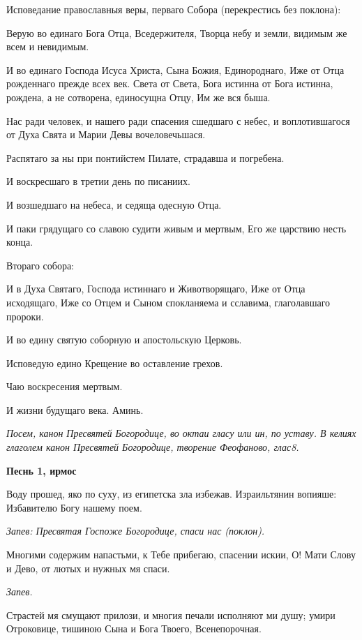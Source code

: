 Исповедание православныя веры, перваго Собора (перекрестись без поклона):


Верую во единаго Бога Отца, Вседержителя, Творца небу и земли, видимым же всем и невидимым.


И во единаго Господа Исуса Христа, Сына Божия, Единороднаго, Иже от Отца рожденнаго прежде всех век. Света от Света, Бога истинна от Бога истинна, рождена, а не сотворена, единосущна Отцу, Им же вся быша.


Нас ради человек, и нашего ради спасения сшедшаго с небес, и воплотившагося от Духа Свята и Марии Девы вочеловечьшася.


Распятаго за ны при понтийстем Пилате, страдавша и погребена.


И воскресшаго в третии день по писаниих.


И возшедшаго на небеса, и седяща одесную Отца.


И паки грядущаго со славою судити живым и мертвым, Его же царствию несть конца.


Втораго собора:


И в Духа Святаго, Господа истиннаго и Животворящаго, Иже от Отца исходящаго, Иже со Отцем и Сыном спокланяема и сславима, глаголавшаго пророки.


И во едину святую соборную и апостольскую Церковь.


Исповедую едино Крещение во оставление грехов.


Чаю воскресения мертвым.


И жизни будущаго века. Аминь.


\itshape Посем, канон Пресвятей Богородице, во октаи гласу или ин, по уставу. В келиях глаголем канон Пресвятей Богородице, творение Феофаново, глас8.\normalfont{}





\bfseries Песнь 1, ирмос\normalfont{}


Воду прошед, яко по суху, из египетска зла избежав. Израильтянин вопияше: Избавителю Богу нашему поем.


\itshape Запев:\normalfont{} Пресвятая Госпоже Богородице, спаси нас \itshape (поклон)\normalfont{}.


Многими содержим напастьми, к Тебе прибегаю, спасении искии, О! Мати Слову и Дево, от лютых и нужных мя спаси.


\itshape Запев.\normalfont{}


Страстей мя смущают прилози, и многия печали исполняют ми душу; умири Отроковице, тишиною Сына и Бога Твоего, Всенепорочная.


